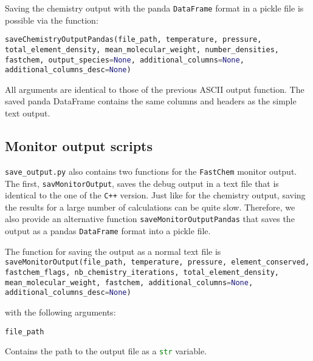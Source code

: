 \documentclass[numbers=noenddot]{aux/fcmanual}
\newcommand{\fc}{\texttt{FastChem}\xspace}
\newcommand{\cpp}{\ttt{C++}\xspace}
\newcommand{\ttt}[1]{\texttt {#1}}
\begin{document}
Saving the chemistry output with the panda \lstinline[language=Python]!DataFrame! format in a pickle file is possible via the function:

\bigbreak

\lstinline[language=Python, breaklines, breakatwhitespace]!saveChemistryOutputPandas(file_path, temperature, pressure, total_element_density, mean_molecular_weight, number_densities, fastchem, output_species=None, additional_columns=None, additional_columns_desc=None)!

\bigbreak

All arguments are identical to those of the previous ASCII output function. The saved panda DataFrame contains the same columns and headers as the simple text output.


\subsection{Monitor output scripts}

\texttt{save\_output.py} also contains two functions for the \fc monitor output. The first, \lstinline[language=Python]!savMonitorOutput!, saves the debug output in a text file that is identical to the one of the \cpp version. Just like for the chemistry output, saving the results for a large number of calculations can be quite slow. Therefore, we also provide an alternative function \lstinline[language=Python]!saveMonitorOutputPandas! that saves the output as a pandas \lstinline[language=Python]!DataFrame! format into a pickle file. 

The function for saving the output as a normal text file is\\

\lstinline[language=Python, breaklines, breakatwhitespace]!saveMonitorOutput(file_path, temperature, pressure, element_conserved, fastchem_flags, nb_chemistry_iterations, total_element_density, mean_molecular_weight, fastchem, additional_columns=None, additional_columns_desc=None)!

\bigbreak

with the following arguments:

\bigbreak

\lstinline[language=Python]!file_path!
\begin{addmargin}[25pt]{0pt}
	Contains the path to the output file as a \lstinline[language=Python]!str! variable.
\end{addmargin}


\bigbreak
\end{document}
